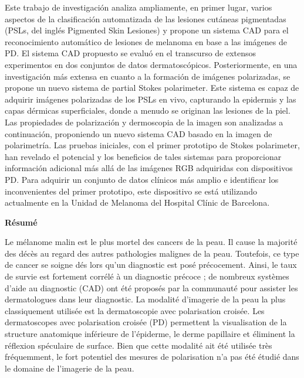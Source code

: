 Este trabajo de investigaci\'on analiza ampliamente, en primer lugar, varios aspectos de la clasificaci\'on automatizada de las lesiones cut\'aneas pigmentadas (PSLs, del ingl\'es Pigmented Skin Lesiones) y propone un sistema CAD para el reconocimiento autom\'atico de lesiones de melanoma en base a las im\'agenes de PD.
El sistema CAD propuesto se evalu\'o en el transcurso de extensos experimentos en dos conjuntos de datos dermatosc\'opicos. Posteriormente, en una investigaci\'on m\'as extensa en cuanto a la formaci\'on de im\'agenes polarizadas, se propone un nuevo sistema de partial Stokes polarimeter.
Este sistema es capaz de adquirir im\'agenes polarizadas de los PSLs en vivo, capturando la epidermis y las capas d\'ermicas superficiales, donde a menudo se originan las lesiones de la piel.
Las propiedades de polarizaci\'on y dermoscopia de la imagen son analizadas a continuaci\'on, proponiendo un nuevo sistema CAD basado en la imagen de polarimetr\'ia. Las pruebas iniciales, con el primer prototipo de Stokes polarimeter, han revelado el potencial y los beneficios de tales sistemas para proporcionar informaci\'on adicional m\'as all\'a de las im\'agenes RGB adquiridas con dispositivos PD.
Para adquirir un conjunto de datos cl\'inicos m\'as amplio e identificar los inconvenientes del primer prototipo, este dispositivo se est\'a utilizando actualmente en la Unidad de Melanoma del Hospital Cl\'inic de Barcelona.
\clearpage
\begin{center} \textbf{R\'esum\'e}\\ \end{center}
Le m\'elanome malin est le plus mortel des cancers de la peau.
Il cause la majorit\'e des d\'ec\`es au regard des autres pathologies malignes de la peau.
Toutefois, ce type de cancer se soigne d\'es lors qu'un diagnostic est pos\'e pr\'ecocement.
Ainsi, le taux de survie est fortement corr\'el\'e \`a un diagnostic pr\'ecoce ; de nombreux syst\`emes d'aide au diagnostic (CAD) ont \'et\'e propos\'es par la communaut\'e pour assister les dermatologues dans leur diagnostic.
La modalit\'e d'imagerie de la peau la plus classiquement utilis\'ee est la dermatoscopie avec polarisation crois\'ee.
Les dermatoscopes avec polarisation crois\'ee (PD) permettent la visualisation de la structure anatomique inf\'erieure de l'\'epiderme, le derme papillaire et \'eliminent la r\'eflexion sp\'eculaire de surface.
Bien que cette modalit\'e ait \'et\'e utilis\'ee tr\`es fr\'equemment, le fort potentiel des mesures de polarisation n'a pas \'et\'e \'etudi\'e dans le domaine de l'imagerie de la peau.


